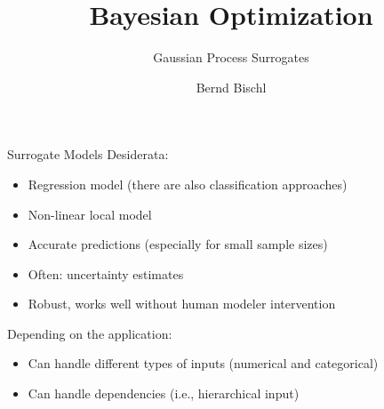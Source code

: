 \documentclass[main]{subfiles}
\begin{document}
\title[AutoML: BO]{Bayesian Optimization}
\subtitle{Gaussian Process Surrogates}
\author[Bernd Bischl]{Bernd Bischl}
\date{}
\maketitle


\begin{frame}{Surrogate Models}
    Desiderata:
    \begin{itemize}
        \item Regression model (there are also classification approaches)
        \item Non-linear local model
        \item Accurate predictions (especially for small sample sizes)
        \item Often: uncertainty estimates
        \item Robust, works well without human modeler intervention
    \end{itemize}
    Depending on the application:
    \begin{itemize}
        \item Can handle different types of inputs (numerical and categorical)
        \item Can handle dependencies (i.e., hierarchical input)
    \end{itemize}
\end{frame}
\end{document}
